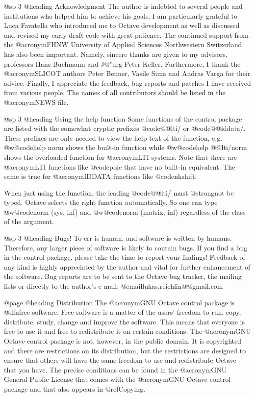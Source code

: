 @sp 3
@heading Acknowledgment
The author is indebted to several people and institutions who helped
him to achieve his goals. I am particularly grateful to Luca Favatella
who introduced me to Octave development as well as discussed and revised
my early draft code with great patience. The continued support from the
@acronym{FHNW} University of Applied Sciences Northwestern Switzerland
has also been important. Namely, sincere thanks are given to my advisors,
professors Hans Buchmann and J@"urg Peter Keller.
Furthermore, I thank the @acronym{SLICOT} authors Peter Benner,
Vasile Sima and Andras Varga for their advice.
Finally, I appreciate the feedback, bug reports and patches I have received
from various people. The names of all contributors should be listed in the
@acronym{NEWS} file.


@sp 3
@heading Using the help function
Some functions of the control package are listed with the somewhat cryptic prefixes
@code{@@lti/} or @code{@@iddata/}. These prefixes are only needed to view the help
text of the function, e.g. @w{@code{help norm}} shows the built-in function while
@w{@code{help @@lti/norm}} shows the overloaded function for @acronym{LTI} systems.
Note that there are @acronym{LTI} functions like @code{pole} that have no built-in
equivalent. The same is true for @acronym{IDDATA} functions like @code{nkshift}.

When just using the function, the leading @code{@@lti/} must @strong{not} be typed.
Octave selects the right function automatically. So one can type @w{@code{norm (sys, inf)}}
and @w{@code{norm (matrix, inf)}} regardless of the class of the argument.


@sp 3
@heading Bugs!
To err is human, and software is written by humans.
Therefore, any larger piece of software is likely to contain bugs.
If you find a bug in the control package, please take the time
to report your findings!
Feedback of any kind is highly appreciated by the author and
vital for further enhancement of the software.
Bug reports are to be sent to the Octave bug tracker, the mailing lists
or directly to the author's e-mail: @email{lukas.reichlin@@gmail.com}


@page
@heading Distribution
The @acronym{GNU} Octave control package is @dfn{free} software.
Free software is a matter of the users' freedom to run, copy, distribute,
study, change and improve the software.
This means that everyone is free to use it and free to redistribute it
on certain conditions.  The @acronym{GNU} Octave control package 
is not, however, in the public domain.  It is copyrighted and there are
restrictions on its distribution, but the restrictions are designed to 
ensure that others will have the same freedom to use and redistribute 
Octave that you have.  The precise conditions can be found in the 
@acronym{GNU} General Public License that comes with the @acronym{GNU}
Octave control package and that also appears in @ref{Copying}.

